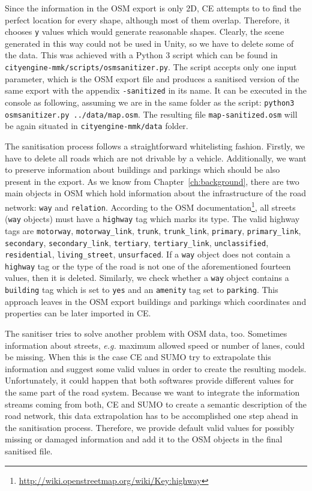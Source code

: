 Since the information in the OSM export is only 2D, CE attempts to to find the perfect location for every shape, although most of them overlap. Therefore, it chooses \texttt{y} values which would generate reasonable shapes. Clearly, the scene generated in this way could not be used in Unity, so we have to delete some of the data. This was achieved with a Python 3 script which can be found in \texttt{cityengine-mmk/scripts/osmsanitizer.py}. The script accepts only one input parameter, which is the OSM export file and produces a sanitised version of the same export with the appendix \texttt{-sanitized} in its name. It can be executed in the console as following, assuming we are in the same folder as the script: \texttt{python3 osmsanitizer.py ../data/map.osm}. The resulting file \texttt{map-sanitized.osm} will be again situated in \texttt{cityengine-mmk/data} folder. 

The sanitisation process follows a straightforward whitelisting fashion. Firstly, we have to delete all roads which are not drivable by a vehicle. Additionally, we want to preserve information about buildings and parkings which should be also present in the export. As we know from Chapter~\ref{ch:background}, there are two main objects in OSM which hold information about the infrastructure of the road network: \texttt{way} and \texttt{relation}. According to the OSM documentation\footnote{\url{http://wiki.openstreetmap.org/wiki/Key:highway}}, all streets (\texttt{way} objects) must have a \texttt{highway} tag which marks its type. The valid highway tags are \texttt{motorway}, \texttt{motorway\_link}, \texttt{trunk}, \texttt{trunk\_link}, \texttt{primary}, \texttt{primary\_link}, \texttt{secondary}, \texttt{secondary\_link}, \texttt{tertiary}, \texttt{tertiary\_link}, \texttt{unclassified}, \texttt{residential}, \texttt{living\_street}, \texttt{unsurfaced}. If a \texttt{way} object does not contain a \texttt{highway} tag or the type of the road is not one of the aforementioned fourteen values, then it is deleted. Similarly, we check whether a \texttt{way} object contains a \texttt{building} tag which is set to \texttt{yes} and an \texttt{amenity} tag set to \texttt{parking}. This approach leaves in the OSM export buildings and parkings which coordinates and properties can be later imported in CE.

The sanitiser tries to solve another problem with OSM data, too. Sometimes information about streets, \emph{e.g.} maximum allowed speed or number of lanes, could be missing. When this is the case CE and SUMO try to extrapolate this information and suggest some valid values in order to create the resulting models. Unfortunately, it could happen that both softwares provide different values for the same part of the road system. Because we want to integrate the information streams coming from both, CE and SUMO to create a semantic description of the road network, this data extrapolation has to be accomplished one step ahead in the sanitisation process. Therefore, we provide default valid values for possibly missing or damaged information and add it to the OSM objects in the final sanitised file.

